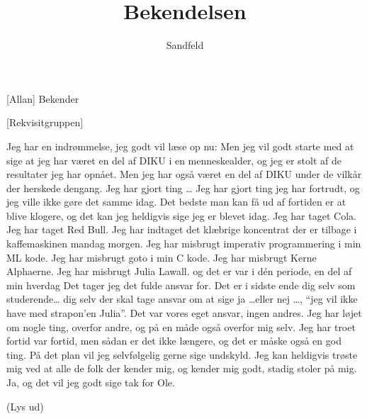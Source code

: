 \documentclass[a4paper,11pt]{article}
\title{Bekendelsen}
\author{Sandfeld}
\begin{document}
\maketitle

\begin{roles}
[Allan] Bekender 
\end{roles}

\begin{props}
[Rekvisitgruppen] 
\end{props}

\begin{sketch}

 Jeg har en indrømmelse, jeg godt vil læse op nu:
 Men jeg vil godt starte med at sige at jeg har været en del af DIKU i en menneskealder, og jeg er stolt af de resultater jeg har opnået.
 Men jeg har også været en del af DIKU under de vilkår der
herskede dengang.
 Jeg har gjort ting \ldots {}
 Jeg har gjort ting jeg har fortrudt,
og jeg ville ikke gøre det samme idag.
 Det bedste man kan få ud af fortiden er at blive klogere,
 og det kan jeg heldigvis sige jeg er blevet idag.
 Jeg har taget Cola.
 Jeg har taget Red Bull.
 Jeg har indtaget det klæbrige koncentrat der er tilbage i kaffemaskinen mandag morgen.
 Jeg har misbrugt imperativ programmering i min ML kode.
 Jeg har misbrugt goto i min C kode.
 Jeg har misbrugt Kerne Alphaerne.
 Jeg har misbrugt Julia Lawall.
 og det er var i dén periode, en del af min hverdag
 Det tager jeg det fulde ansvar for.
 Det er i sidste ende dig selv som studerende\ldots
{} dig selv der skal tage ansvar om at sige ja \ldots eller nej
\ldots , ``jeg vil ikke have med strapon'en Julia''.
 Det var vores eget ansvar, ingen andres.
 Jeg har løjet om nogle ting, overfor andre, og på en måde
også overfor mig selv.
 Jeg har troet fortid var fortid, men sådan er det ikke
længere, og det er måske også en god ting.
 På det plan vil jeg selvfølgelig gerne sige undskyld.
 Jeg kan heldigvis trøste mig ved at alle de folk der kender mig,
og kender mig godt, stadig stoler på mig.
 Ja, og det vil jeg godt sige tak for Ole.


\scene(Lys ud)

\end{sketch}
\end{document}

